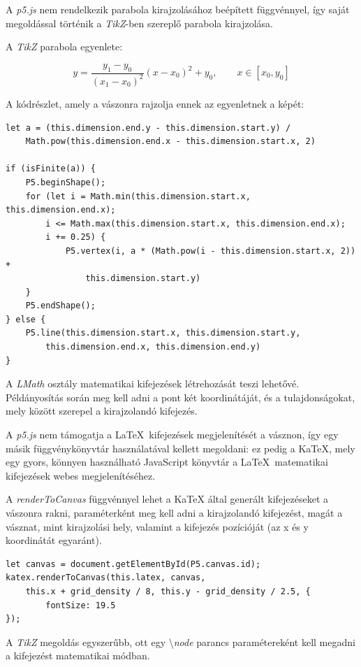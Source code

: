 A \textit{p5.js} nem rendelkezik parabola kirajzolásához beépített függvénnyel, így saját megoldással történik a \textit{TikZ}-ben szereplő parabola kirajzolása. 

A \textit{TikZ} parabola egyenlete: 

$$\displaystyle y = \frac{y_1 - y_0}{(x_1 - x_0)^2}(x - x_0)^2 + y_0, \qquad x\in[x_0, y_0]$$

A kódrészlet, amely a vászonra rajzolja ennek az egyenletnek a képét:

\begin{lstlisting}[style=es6]
let a = (this.dimension.end.y - this.dimension.start.y) / 
    Math.pow(this.dimension.end.x - this.dimension.start.x, 2)

if (isFinite(a)) {
	P5.beginShape();
	for (let i = Math.min(this.dimension.start.x, this.dimension.end.x); 
	    i <= Math.max(this.dimension.start.x, this.dimension.end.x); 
	    i += 0.25) {
		    P5.vertex(i, a * (Math.pow(i - this.dimension.start.x, 2)) +
		        this.dimension.start.y)
	}
	P5.endShape();
} else {
	P5.line(this.dimension.start.x, this.dimension.start.y, 
	    this.dimension.end.x, this.dimension.end.y)
}
\end{lstlisting}


A \textit{LMath} osztály matematikai kifejezések létrehozását teszi lehetővé. Példányosítás során meg kell adni a pont két koordinátáját, és a tulajdonságokat, mely között szerepel a kirajzolandó kifejezés. 

A \textit{p5.js} nem támogatja a \LaTeX\ kifejezések megjelenítését a vásznon, így egy másik függvénykönyvtár használatával kellett megoldani: ez pedig a KaTeX{\cite{katex}}, mely egy gyors, könnyen használható JavaScript könyvtár a \LaTeX\ matematikai kifejezések webes megjelenítéséhez.

A \textit{renderToCanvas} függvénnyel lehet a KaTeX által generált kifejezéseket a vászonra rakni, paraméterként meg kell adni a kirajzolandó kifejezést, magát a vásznat, mint kirajzolási hely, valamint a kifejezés pozícióját (az x és y koordinátát egyaránt).

\begin{lstlisting}[style=es6]
let canvas = document.getElementById(P5.canvas.id);
katex.renderToCanvas(this.latex, canvas, 
    this.x + grid_density / 8, this.y - grid_density / 2.5, {
	    fontSize: 19.5
});
\end{lstlisting}

A \textit{TikZ} megoldás egyszerűbb, ott egy \textbackslash \textit{node} parancs paramétereként kell megadni a kifejezést matematikai módban.

